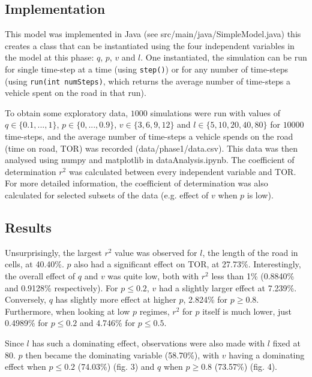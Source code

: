 \documentclass{article}
\begin{document}
\subsection*{Implementation}

This model was implemented in Java (see src/main/java/SimpleModel.java) this creates a class that can be instantiated using the four independent variables in the model at this phase: $q$, $p$, $v$ and $l$. One instantiated, the simulation can be run for single time-step at a time (using \texttt{step()}) or for any number of time-steps (using \texttt{run(int numSteps)}, which returns the average number of time-steps a vehicle spent on the road in that run).

To obtain some exploratory data, $1000$ simulations were run with values of $q \in \{0.1, ... , 1\}$, $p \in \{0, ... , 0.9\}$, $v \in \{3, 6, 9, 12\}$ and $l \in \{5, 10, 20, 40, 80\}$ for $10000$ time-steps, and the average number of time-steps a vehicle spends on the road (time on road, TOR) was recorded (data/phase1/data.csv). This data was then analysed using numpy and matplotlib in dataAnalysis.ipynb. The coefficient of determination $r^{2}$ was calculated between every independent variable and TOR. For more detailed information, the coefficient of determination was also calculated for selected subsets of the data (e.g. effect of $v$ when $p$ is low).

\subsection*{Results}

Unsurprisingly, the largest $r^{2}$ value was observed for $l$, the length of the road in cells, at 40.40\%. $p$ also had a significant effect on TOR, at 27.73\%. Interestingly, the overall effect of $q$ and $v$ was quite low, both with $r^{2}$ less than 1\% (0.8840\% and 0.9128\% respectively). For $p \leq 0.2$, $v$ had a slightly larger effect at 7.239\%. Conversely, $q$ has slightly more effect at higher $p$, 2.824\% for $p \geq 0.8$. Furthermore, when looking at low $p$ regimes, $r^{2}$ for $p$ itself is much lower, just 0.4989\% for $p \leq 0.2$ and 4.746\% for $p \leq 0.5$.

Since $l$ has such a dominating effect, observations were also made with $l$ fixed at 80. $p$ then became the dominating variable (58.70\%), with $v$ having a dominating effect when $p \leq 0.2$ (74.03\%) (fig. 3) and $q$ when $p \geq 0.8$ (73.57\%) (fig. 4).
\end{document}
